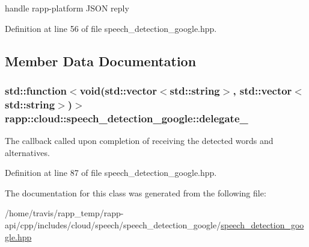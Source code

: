handle rapp-\/platform J\-S\-O\-N reply 



Definition at line 56 of file speech\-\_\-detection\-\_\-google.\-hpp.



\subsection{Member Data Documentation}
\hypertarget{classrapp_1_1cloud_1_1speech__detection__google_ab5e6f6510bd6ff397a719423faa56780}{
\subsubsection[{delegate\-\_\-}]{\setlength{\rightskip}{0pt plus 5cm}std\-::function$<$void(std\-::vector$<$std\-::string$>$, std\-::vector$<$std\-::string$>$)$>$ rapp\-::cloud\-::speech\-\_\-detection\-\_\-google\-::delegate\-\_\-\hspace{0.3cm}{\ttfamily [private]}}}\label{classrapp_1_1cloud_1_1speech__detection__google_ab5e6f6510bd6ff397a719423faa56780}


The callback called upon completion of receiving the detected words and alternatives. 



Definition at line 87 of file speech\-\_\-detection\-\_\-google.\-hpp.



The documentation for this class was generated from the following file\-:\begin{DoxyCompactItemize}
\item 
/home/travis/rapp\-\_\-temp/rapp-\/api/cpp/includes/cloud/speech/speech\-\_\-detection\-\_\-google/\hyperlink{speech__detection__google_8hpp}{speech\-\_\-detection\-\_\-google.\-hpp}\end{DoxyCompactItemize}
